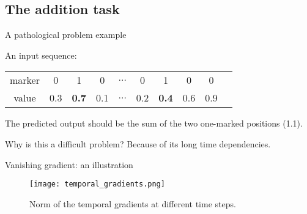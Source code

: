 \subsection{The addition task}
\begin{frame}{A pathological problem example}
	
	
	An input sequence:
	
	\vspace{1em}
	
	\begin{tabular}{|c|c|c|c|c|c|c|c|c|c}
		\hline  marker & 0&  1&  0&  $\hdots$& 0 & 1 & 0 & 0  \\ 
		value & 0.3&  \textbf{0.7}&  0.1&  $\hdots$& 0.2& \textbf{0.4} & 0.6& 0.9  \\ 
		\hline 
	\end{tabular}
	
	\vspace{1em}
	The predicted output should be the sum of the two one-marked positions (1.1). 
	\pause
	\vspace{1em}
	\begin{block}{Why is this a difficult problem?}
		Because of its long time dependencies.
	\end{block}
	
\end{frame}

\begin{frame}{Vanishing gradient: an illustration}
	\begin{figure}
		\centering
		\texttt{[image: temporal\_gradients.png]}
		\caption{Norm of the temporal gradients at different time steps.}
	\end{figure}
\end{frame}


